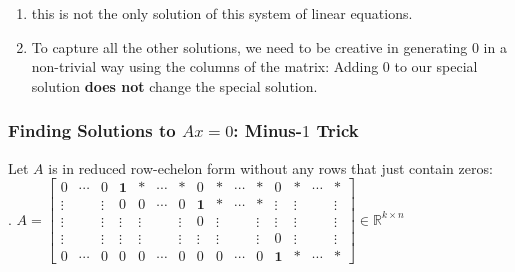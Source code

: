\begin{enumerate}
    \item this is not the only solution of this system of linear equations.
    \hfill \cite{mfml/book/mml/Deisenroth-Faisal-Ong}

    \item To capture all the other solutions, we need to be creative in generating $0$ in a non-trivial way using the columns of the matrix: Adding $0$ to our special solution \textbf{does not} change the special solution. 
    \hfill \cite{mfml/book/mml/Deisenroth-Faisal-Ong}

    
\end{enumerate}







\subsubsection{Finding Solutions to $Ax=0$: Minus-$1$ Trick \cite{mfml/book/mml/Deisenroth-Faisal-Ong}}

Let $A$ is in reduced row-echelon form without any rows that just contain zeros:\\
.\hfill
$
    A
    = 
    \begin{bmatrix}
        0 & \cdots & 0 & \mathbf{1} & * & \cdots & * & 0 & * & \cdots & * & 0 & * & \cdots & * \\
        \vdots & & \vdots & 0 & 0 & \cdots & 0 & \mathbf{1} & * & \cdots & * & \vdots & \vdots & & \vdots\\
        \vdots & & \vdots & \vdots & \vdots &  & \vdots & 0 & \vdots & & \vdots & \vdots & \vdots & & \vdots\\
        \vdots & & \vdots & \vdots & \vdots &  & \vdots & \vdots & \vdots & & \vdots & 0 & \vdots & & \vdots\\
        0 & \cdots & 0 & 0 & 0 & \cdots & 0 & 0 & 0 & \cdots & 0 & \mathbf{1} & * & \cdots & *
    \end{bmatrix}
    \in \mathbb{R}^{k\times n}
$
\hfill \cite{mfml/book/mml/Deisenroth-Faisal-Ong}

\vspace{0.2cm}


